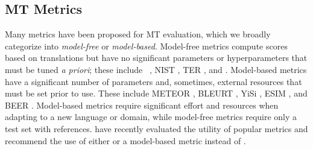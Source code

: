 \subsection{MT Metrics}
 Many metrics have been proposed for MT evaluation, which we broadly categorize into \textit{model-free} or \textit{model-based}. Model-free metrics compute scores based on translations but have no significant parameters or hyperparameters that must be tuned \textit{a priori}; these include  \bleu\ \cite{papineni-etal-2002-bleu}, NIST \cite{doddington2002-nist}, TER \cite{snover2006TER}, and  \cite{popovic-2015-chrf}.  Model-based metrics have a significant number of parameters and, sometimes, external resources that must be set prior to use. These include METEOR \cite{banerjee-lavie-2005-meteor},  BLEURT \cite{sellam-etal-2020-bleurt}, YiSi \cite{lo-2019-yisi}, ESIM \cite{mathur-etal-2019-ESIM}, and BEER \cite{stanojevic-simaan-2014-beer}. Model-based metrics require significant effort and resources when adapting to a new language or domain, while model-free metrics require only a test set with references. 
\citet{mathur-etal-2020-tangled} have recently evaluated the utility of popular metrics and recommend the use of either  or a model-based metric instead of \bleu. 


